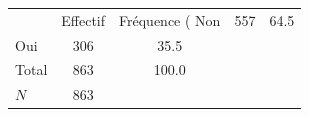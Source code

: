 {
\def\sym#1{\ifmmode^{#1}\else\(^{#1}\)\fi}
\begin{tabular}{l*{1}{cc}}
\toprule
            &    Effectif&Fréquence (%
\midrule
Non         &         557&        64.5\\
Oui         &         306&        35.5\\
Total       &         863&       100.0\\
\midrule
\(N\)       &         863&            \\
\bottomrule
\end{tabular}
}
